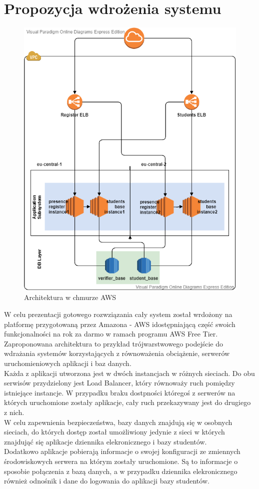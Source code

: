 \documentclass[declaration,shortabstract, mgr]{iithesis}
\begin{document}
\section{Propozycja wdrożenia systemu}
\begin{figure}[h]
\caption{Architektura w chmurze AWS}
\centering
\includegraphics[scale=0.6]{AWS.png}
\end{figure}
\indent W celu prezentacji gotowego rozwziązania cały system został wrdożony na platformę przygotowaną przez Amazona - AWS\cite{aws} idostępniającą część swoich funkcjonalności na rok za darmo w ramach programu AWS Free Tier. \\
\indent Zaproponowana architektura to przykład trójwarstwowego podejście do wdrażania systemów korzystających z równoważenia obciążenie, serwerów uruchomieniowych aplikacji i baz danych. \\
\indent Każda z aplikacji utworzona jest w dwóch instancjach w różnych sieciach. Do obu serwisów przydzielony jest Load Balancer, który równoważy ruch pomiędzy istniejące instancje. W przypadku braku dostpności któregoś z serwerów na których uruchomione zostały aplikacje, cały ruch przekazywany jest do drugiego z nich.\\
\indent W celu zapewnienia bezpieczeństwa, bazy danych znajdują się w osobnych sieciach, do których dostęp został umożliwiony jedynie z sieci w których znajdująć się aplikacje dziennika elekronicznego i bazy studentów. \\
\indent Dodatkowo aplikacje pobierają informacje o swojej konfiguracji ze zmiennych środowiskowych serwera na którym zostały uruchomione. Są to informacje o sposobie połączenia z bazą danych, a w przypadku dziennika elekronicznego również odnośnik i dane do logowania do aplikacji bazy studentów.
\end{document}
